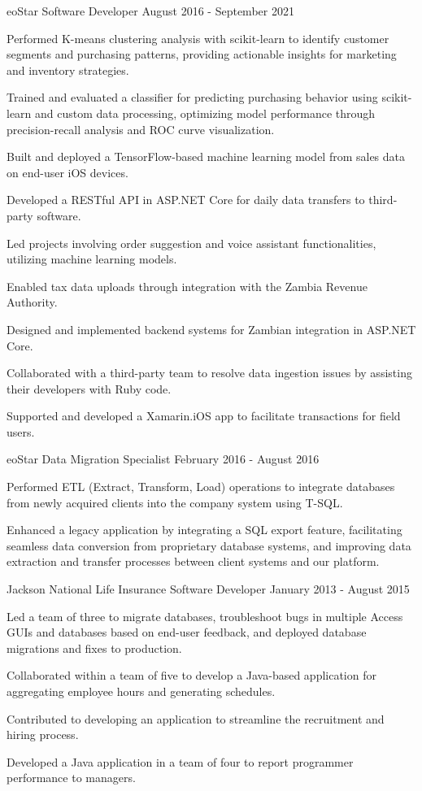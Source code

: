 \documentclass{../styles/cv}
\begin{document}
\subsectionpositiondate
    {eoStar}
    {Software Developer}
    {August 2016 - September 2021}
\resumesublistbegin
    \item Performed K-means clustering analysis with scikit-learn to identify customer segments and purchasing patterns, providing actionable insights for marketing and inventory strategies.
    \item Trained and evaluated a classifier for predicting purchasing behavior using scikit-learn and custom data processing, optimizing model performance through precision-recall analysis and ROC curve visualization.
    \item Built and deployed a TensorFlow-based machine learning model from sales data on end-user iOS devices.
    \item Developed a RESTful API in ASP.NET Core for daily data transfers to third-party software.
    \item Led projects involving order suggestion and voice assistant functionalities, utilizing machine learning models.
    \item Enabled tax data uploads through integration with the Zambia Revenue Authority.
    \item Designed and implemented backend systems for Zambian integration in ASP.NET Core.
    \item Collaborated with a third-party team to resolve data ingestion issues by assisting their developers with Ruby code.
    \item Supported and developed a Xamarin.iOS app to facilitate transactions for field users.
\resumesublistend

\subsectionpositiondate
    {eoStar}
    {Data Migration Specialist}
    {February 2016 - August 2016}
\resumesublistbegin
    \item Performed ETL (Extract, Transform, Load) operations to integrate databases from newly acquired clients into the company system using T-SQL.
    \item Enhanced a legacy \cpp application by integrating a SQL export feature, facilitating seamless data conversion from proprietary database systems, and improving data extraction and transfer processes between client systems and our platform.
\resumesublistend

\subsectionpositiondate
    {Jackson National Life Insurance}
    {Software Developer}
    {January 2013 - August 2015}
\resumesublistbegin
    \item Led a team of three to migrate databases, troubleshoot bugs in multiple Access GUIs and databases based on end-user feedback, and deployed database migrations and fixes to production.
    \item Collaborated within a team of five to develop a Java-based application for aggregating employee hours and generating schedules.
    \item Contributed to developing an application to streamline the recruitment and hiring process.
    \item Developed a Java application in a team of four to report programmer performance to managers.
\resumesublistend
\end{document}
